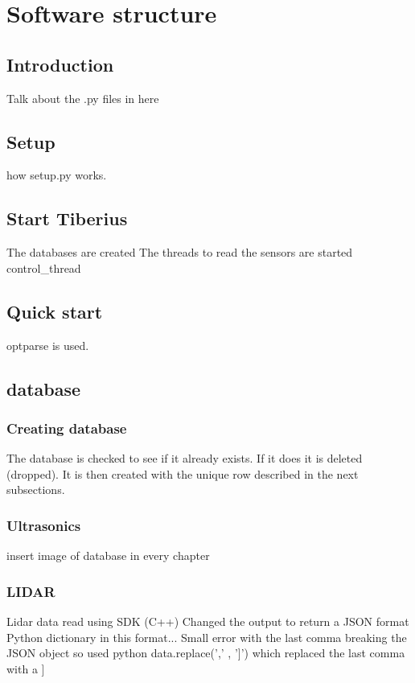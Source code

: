 \section{Software structure}
\pagestyle{aidan}

\subsection{Introduction}
Talk about the .py files in here

\subsection{Setup}
how setup.py works.

\subsection{Start Tiberius}
The databases are created
The threads to read the sensors are started 
control_thread

\subsection{Quick start}
optparse is used.

\subsection{database}

\subsubsection{Creating database}
The database is checked to see if it already exists. If it does it is deleted (dropped). It is then created with the unique row described in the next subsections. 

\subsubsection{Ultrasonics}
insert image of database in every chapter


\subsubsection{LIDAR}
Lidar data read using SDK (C++)
Changed the output to return a JSON format
Python dictionary in this format...
Small error with the last comma breaking the JSON object so used python data.replace(',\n' , ']') which replaced the last comma with a ]

